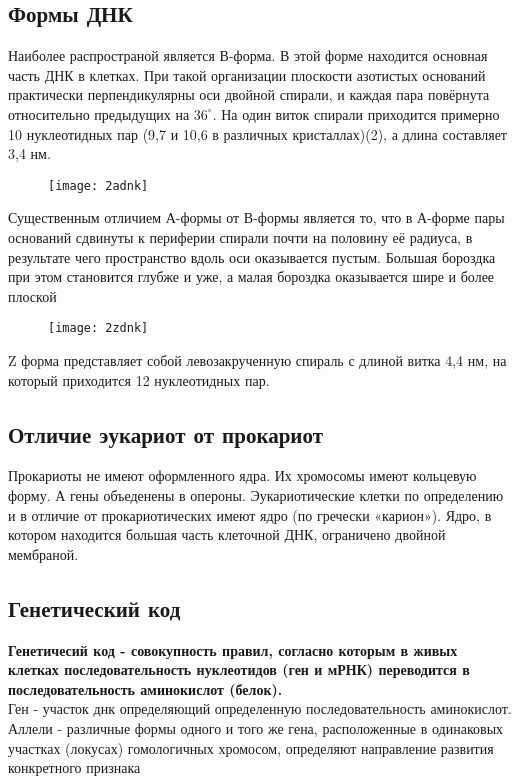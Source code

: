 	\subsection{Формы ДНК}
	Наиболее распространой является В-форма. В этой форме находится основная часть ДНК в клетках. При такой организации плоскости азотистых оснований практически перпендикулярны оси двойной спирали, и каждая пара повёрнута относительно предыдущих на $36^\circ$. На один виток спирали приходится примерно 10 нуклеотидных пар (9,7 и 10,6 в различных кристаллах)(2), а длина составляет 3,4 нм.
	\begin{figure}[H]
		\centering
		\texttt{[image: 2adnk]}
	\end{figure}
Существенным отличием А-формы от В-формы является то, что в А-форме пары оснований сдвинуты к периферии спирали почти на половину её радиуса, в результате чего пространство вдоль оси оказывается пустым. Большая бороздка при этом становится глубже и уже, а малая бороздка оказывается шире и более плоской
	\begin{figure}[H]
		\texttt{[image: 2zdnk]}
	\end{figure} 
Z форма представляет собой левозакрученную спираль с длиной витка 4,4 нм, на который приходится 12 нуклеотидных пар.
		\subsection{Отличие эукариот от прокариот}
		Прокариоты не имеют оформленного ядра. Их хромосомы имеют кольцевую форму. А гены объеденены в опероны.
		Эукариотические клетки по определению и в отличие от прокариотических имеют ядро (по гречески «карион»). Ядро, в котором
		находится большая часть клеточной ДНК, ограничено двойной мембраной. 
	
	\subsection{Генетический код}
	\textbf{Генетичесий код - совокупность правил, согласно которым в живых клетках последовательность нуклеотидов (ген и мРНК) переводится в последовательность аминокислот (белок).}\\
	Ген - участок днк определяющий определенную последовательность аминокислот.\\
	Аллели - различные формы одного и того же гена, расположенные в одинаковых участках (локусах) гомологичных хромосом, определяют направление развития конкретного признака
	
